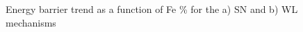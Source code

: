 \documentclass[preprint]{elsarticle}
\begin{document}
\begin{figure}[htp!]%
    \centering
\caption{Energy barrier trend as a function of Fe \%  for the a) SN and b) WL mechanisms}
  \end{figure}
 
\end{document}
